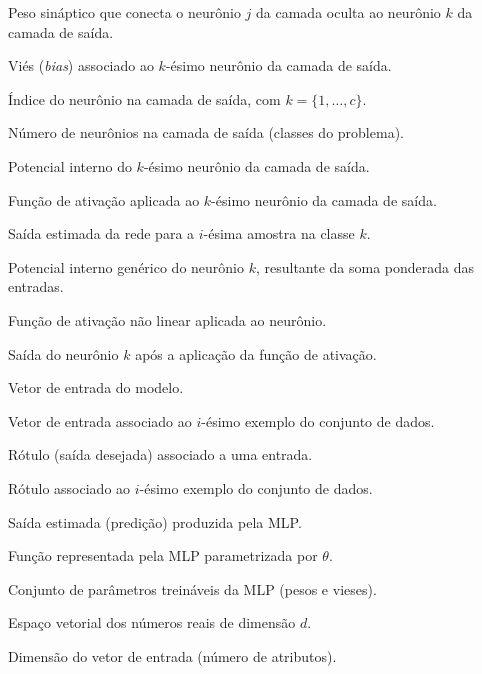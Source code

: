 \documentclass[
	12pt,				%
	oneside,
	a4paper,			%
	english,			%
	french,				%
	spanish,			%
	brazil				%
	]{abntex2}
\begin{document}
\begin{simbolos}
\item[\textbf{$\omega^{o}_{k,j}$}] Peso sináptico que conecta o neurônio $j$ da camada oculta ao neurônio $k$ da camada de saída.
\item[\textbf{$\theta^{o}_{k}$}] Viés (\textit{bias}) associado ao $k$-ésimo neurônio da camada de saída.
\item[\textbf{$k$}] Índice do neurônio na camada de saída, com $k = \{1,\ldots,c\}$.
\item[\textbf{$c$}] Número de neurônios na camada de saída (classes do problema).
\item[\textbf{$\mathrm{rede}^{o}_{k}$}] Potencial interno do $k$-ésimo neurônio da camada de saída.
\item[\textbf{$f^{o}_{k}(\cdot)$}] Função de ativação aplicada ao $k$-ésimo neurônio da camada de saída.
\item[\textbf{$\hat{y}_{i,k}$}] Saída estimada da rede para a $i$-ésima amostra na classe $k$.
\item[\textbf{$v_k$}] Potencial interno genérico do neurônio $k$, resultante da soma ponderada das entradas.
\item[\textbf{$\varphi(\cdot)$}] Função de ativação não linear aplicada ao neurônio.
\item[\textbf{$y_k$}] Saída do neurônio $k$ após a aplicação da função de ativação.

\item[\textbf{$x$}] Vetor de entrada do modelo.
\item[\textbf{$x_i$}] Vetor de entrada associado ao $i$-ésimo exemplo do conjunto de dados.
\item[\textbf{$y$}] Rótulo (saída desejada) associado a uma entrada.
\item[\textbf{$y_i$}] Rótulo associado ao $i$-ésimo exemplo do conjunto de dados.
\item[\textbf{$\hat{y}$}] Saída estimada (predição) produzida pela MLP.
\item[\textbf{$f_{\theta}(\cdot)$}] Função representada pela MLP parametrizada por $\theta$.
\item[\textbf{$\theta$}] Conjunto de parâmetros treináveis da MLP (pesos e vieses).

\item[\textbf{$\mathbb{R}^{d}$}] Espaço vetorial dos números reais de dimensão $d$.
\item[\textbf{$d$}] Dimensão do vetor de entrada (número de atributos).


\end{simbolos}
\end{document}
